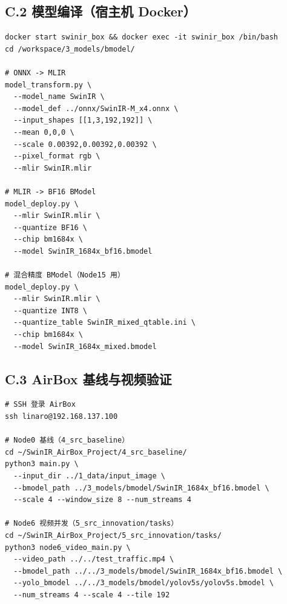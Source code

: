 \documentclass[12pt,a4paper]{ctexart}
\begin{document}
\subsection*{C.2 模型编译（宿主机 Docker）}
\begin{verbatim}
docker start swinir_box && docker exec -it swinir_box /bin/bash
cd /workspace/3_models/bmodel/

# ONNX -> MLIR
model_transform.py \
  --model_name SwinIR \
  --model_def ../onnx/SwinIR-M_x4.onnx \
  --input_shapes [[1,3,192,192]] \
  --mean 0,0,0 \
  --scale 0.00392,0.00392,0.00392 \
  --pixel_format rgb \
  --mlir SwinIR.mlir

# MLIR -> BF16 BModel
model_deploy.py \
  --mlir SwinIR.mlir \
  --quantize BF16 \
  --chip bm1684x \
  --model SwinIR_1684x_bf16.bmodel

# 混合精度 BModel（Node15 用）
model_deploy.py \
  --mlir SwinIR.mlir \
  --quantize INT8 \
  --quantize_table SwinIR_mixed_qtable.ini \
  --chip bm1684x \
  --model SwinIR_1684x_mixed.bmodel
\end{verbatim}

\subsection*{C.3 AirBox 基线与视频验证}
\begin{verbatim}
# SSH 登录 AirBox
ssh linaro@192.168.137.100

# Node0 基线（4_src_baseline）
cd ~/SwinIR_AirBox_Project/4_src_baseline/
python3 main.py \
  --input_dir ../1_data/input_image \
  --bmodel_path ../3_models/bmodel/SwinIR_1684x_bf16.bmodel \
  --scale 4 --window_size 8 --num_streams 4

# Node6 视频并发（5_src_innovation/tasks）
cd ~/SwinIR_AirBox_Project/5_src_innovation/tasks/
python3 node6_video_main.py \
  --video_path ../../test_traffic.mp4 \
  --bmodel_path ../../3_models/bmodel/SwinIR_1684x_bf16.bmodel \
  --yolo_bmodel ../../3_models/bmodel/yolov5s/yolov5s.bmodel \
  --num_streams 4 --scale 4 --tile 192
\end{verbatim}
\end{document}
